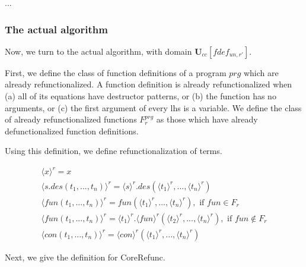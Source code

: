 ...

\subsubsection{The actual algorithm}

Now, we turn to the actual algorithm, with domain $\mathbf{U}_{cc}[fdef_{un,r'}]$.

First, we define the class of function definitions of a program $prg$ which are already refunctionalized. A function definition is already refunctionalized when (a) all of its equations have destructor patterns, or (b) the function has no arguments, or (c) the first argument of every lhs is a variable. We define the class of already refunctionalized functions $F^{prg}_r$ as those which have already defunctionalized function definitions.

Using this definition, we define refunctionalization of terms.

\begin{align*}
\langle x \rangle^r = x \\
\langle s.des(t_1, ..., t_n) \rangle^r = \langle s \rangle^r .des(\langle t_1 \rangle^r, ..., \langle t_n \rangle^r) \\
\langle fun(t_1, ..., t_n) \rangle^r = fun(\langle t_1 \rangle^r, ..., \langle t_n \rangle^r), \text{ if } fun \in F_r \\
\langle fun(t_1, ..., t_n) \rangle^r = \langle t_1 \rangle^r .\langle fun \rangle^r (\langle t_2 \rangle^r, ..., \langle t_n \rangle^r), \text{ if } fun \not\in F_r \\
\langle con(t_1, ..., t_n) \rangle^r = \langle con \rangle^r (\langle t_1 \rangle^r, ..., \langle t_n \rangle^r)
\end{align*}

Next, we give the definition for \textsf{CoreRefunc}.

